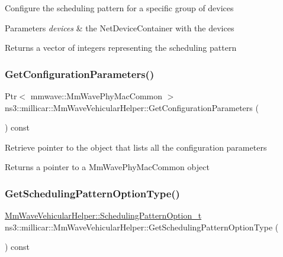 Configure the scheduling pattern for a specific group of devices 
\begin{DoxyParams}{Parameters}
{\em devices} & the Net\+Device\+Container with the devices \\
\hline
\end{DoxyParams}
\begin{DoxyReturn}{Returns}
a vector of integers representing the scheduling pattern 
\end{DoxyReturn}
\mbox{\label{classns3_1_1millicar_1_1MmWaveVehicularHelper_aa1ab3205ac126fabac48608c0bbf8dcd}} 
\subsubsection{\texorpdfstring{Get\+Configuration\+Parameters()}{GetConfigurationParameters()}}
{\footnotesize\ttfamily Ptr$<$ mmwave\+::\+Mm\+Wave\+Phy\+Mac\+Common $>$ ns3\+::millicar\+::\+Mm\+Wave\+Vehicular\+Helper\+::\+Get\+Configuration\+Parameters (\begin{DoxyParamCaption}{ }\end{DoxyParamCaption}) const}

Retrieve pointer to the object that lists all the configuration parameters \begin{DoxyReturn}{Returns}
a pointer to a Mm\+Wave\+Phy\+Mac\+Common object 
\end{DoxyReturn}
\mbox{\label{classns3_1_1millicar_1_1MmWaveVehicularHelper_a6d6431806df6b60f555880c26c21ce5e}} 
\subsubsection{\texorpdfstring{Get\+Scheduling\+Pattern\+Option\+Type()}{GetSchedulingPatternOptionType()}}
{\footnotesize\ttfamily \hyperlink{classns3_1_1millicar_1_1MmWaveVehicularHelper_a7b56a1dec16b395a2b07f3e2267bc8e8}{Mm\+Wave\+Vehicular\+Helper\+::\+Scheduling\+Pattern\+Option\+\_\+t} ns3\+::millicar\+::\+Mm\+Wave\+Vehicular\+Helper\+::\+Get\+Scheduling\+Pattern\+Option\+Type (\begin{DoxyParamCaption}{ }\end{DoxyParamCaption}) const}

